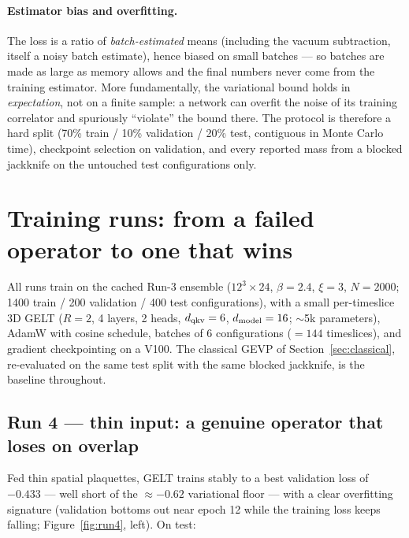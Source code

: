 \documentclass[11pt,a4paper]{article}
\begin{document}
\paragraph{Estimator bias and overfitting.} The loss is a ratio of
\emph{batch-estimated} means (including the vacuum subtraction, itself a
noisy batch estimate), hence biased on small batches --- so batches are made
as large as memory allows and the final numbers never come from the training
estimator. More fundamentally, the variational bound holds in
\emph{expectation}, not on a finite sample: a network can overfit the noise
of its training correlator and spuriously ``violate'' the bound there. The
protocol is therefore a hard split (70\% train / 10\% validation / 20\% test,
contiguous in Monte Carlo time), checkpoint selection on validation, and every
reported mass from a blocked jackknife on the untouched test configurations
only.

\section{Training runs: from a failed operator to one that wins}
\label{sec:runs}

All runs train on the cached Run-3 ensemble ($12^3\times24$, $\beta=2.4$,
$\xi=3$, $N=2000$; 1400 train / 200 validation / 400 test configurations),
with a small per-timeslice 3D GELT ($R=2$, 4 layers, 2 heads,
$d_{\rm qkv}=6$, $d_{\rm model}=16$; $\sim$5k parameters), AdamW with cosine
schedule, batches of 6 configurations ($=144$ timeslices), and gradient
checkpointing on a V100. The classical GEVP of Section~\ref{sec:classical},
re-evaluated on the same test split with the same blocked jackknife, is the
baseline throughout.

\subsection{Run 4 --- thin input: a genuine operator that loses on overlap}
\label{sec:run4}

Fed thin spatial plaquettes, GELT trains stably to a best validation loss of
$-0.433$ --- well short of the $\approx-0.62$ variational floor --- with a
clear overfitting signature (validation bottoms out near epoch 12 while the
training loss keeps falling; Figure~\ref{fig:run4}, left). On test:
\end{document}
